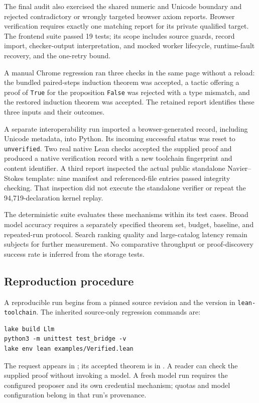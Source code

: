 \documentclass[10pt,a4paper]{article}
\newcommand{\code}[1]{\texttt{#1}}
\begin{document}
The final audit also exercised the shared numeric and Unicode boundary and
rejected contradictory or wrongly targeted browser axiom reports. Browser
verification requires exactly one matching report for its private qualified
target. The frontend suite passed 19 tests; its scope includes source guards,
record import, checker-output interpretation, and mocked worker lifecycle,
runtime-fault recovery, and the one-retry bound.

A manual Chrome regression ran three checks in the same page without a reload:
the bundled paired-steps induction theorem was accepted, a tactic offering a
proof of \code{True} for the proposition \code{False} was rejected with a type
mismatch, and the restored induction theorem was accepted. The retained report
identifies these three inputs and their outcomes.

A separate interoperability run imported a browser-generated record, including
Unicode metadata, into Python. Its incoming successful status was reset to
\code{unverified}. Two real native Lean checks accepted the supplied proof and
produced a native verification record with a new toolchain fingerprint and
content identifier. A third report inspected the actual public standalone
Navier--Stokes template: nine manifest and referenced-file entries passed
integrity checking. That inspection did not execute the standalone verifier or
repeat the 94,719-declaration kernel replay.

The deterministic suite evaluates these mechanisms within its test cases.
Broad model accuracy requires a separately specified theorem set, budget,
baseline, and repeated-run protocol. Search ranking quality and large-catalog
latency remain subjects for further measurement. No comparative throughput or
proof-discovery success rate is inferred from the storage tests.

\subsection{Reproduction procedure}
A reproducible run begins from a pinned source revision and the version in
\code{lean-toolchain}. The inherited source-only regression commands are:
\begin{lstlisting}
lake build Llm
python3 -m unittest test_bridge -v
lake env lean examples/Verified.lean
\end{lstlisting}
The request appears in ; its accepted theorem is
in . A reader can
check the supplied proof without invoking a model. A fresh model run requires
the configured proposer and its own credential mechanism; quotas and model
configuration belong in that run's provenance.
\end{document}

